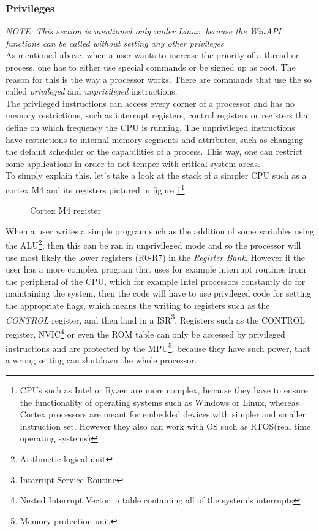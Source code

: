 \subsubsection{Privileges}
\textit{NOTE: This section is mentioned only under Linux, because the WinAPI functions can be called without setting any other privileges}\\
As mentioned above, when a user wants to increase the priority of a thread or process, one has to either use special commands or be signed up as root. The reason for this is the way a processor works. There are commands that use the so called \textit{privileged} and \textit{unprivileged} instructions.\\
The privileged instructions can access every corner of a processor and has no memory restrictions, such as interrupt registers, control registers or registers that define on which frequency the CPU is running. The unprivileged instructions have restrictions to internal memory segments and attributes, such as changing the default scheduler or the capabilities of a process. This way, one can restrict some applications in order to not temper with critical system areas.\\
To simply explain this, let's take a look at the stack of a simpler CPU such as a cortex M4 and its registers pictured in figure \ref{cortex_M4_registers}\footnote{CPUs such as Intel or Ryzen are more complex, because they have to ensure the functionality of operating systems such as Windows or Linux, whereas Cortex processors are meant for embedded devices with simpler and smaller instruction set. However they also can work with OS such as RTOS(real time operating systems)}.
\begin{figure}[!htbp]
	\centering
	\caption{Cortex M4 register}
	\label{cortex_M4_registers}
\end{figure}
When a user writes a simple program such as the addition of some variables using the ALU\footnote{Arithmetic logical unit}, then this can be ran in unprivileged mode and so the processor will use most likely the lower registers (R0-R7) in the \textit{Register Bank}. However if the user has a more complex program that uses for example interrupt routines from the peripheral of the CPU, which for example Intel processors constantly do for maintaining the system, then the code will have to use privileged code for setting the appropriate flags, which means the writing to registers such as the \textit{CONTROL} register, and then land in a ISR\footnote{Interrupt Service Routine}. Registers such as the CONTROL register, NVIC\footnote{Nested Interrupt Vector: a table containing all of the system's interrupts} or even the ROM table can only be accessed by privileged instructions and are protected by the MPU\footnote{Memory protection unit}, because they have such power, that a wrong setting can shutdown the whole processor\cite{cortexM4}.
